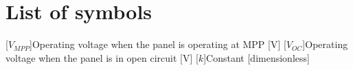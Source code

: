 %
%
%
%
%
%
%
%
%
%

\chapter*{List of symbols}

\begin{acronym}[XXXXXXXXXX]
    [\ensuremath{V_{MPP}}]{Operating voltage when the panel is operating at MPP [\si{\volt}]}
    [\ensuremath{V_{OC}}]{Operating voltage when the panel is in open circuit [\si{\volt}]}
    [\ensuremath{k}]{Constant [dimensionless]}
\end{acronym}